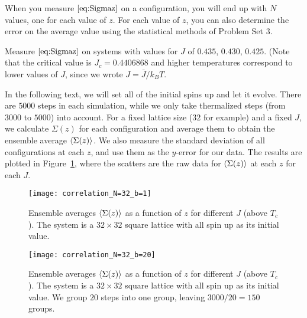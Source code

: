When you measure \(\eqref{eq:Sigmaz}\) on a configuration, you will end up with \(N\)
values, one for each value of \(z\). For each value of \(z\), you can also determine the
error on the average value using the statistical methods of Problem Set 3.

\Question{} Measure \(\eqref{eq:Sigmaz}\) on systems with values for \(J\) of \(0.435\),
\(0.430\), \(0.425\). (Note that the critical value is \(J_c = 0.4406868\) and higher
temperatures correspond to lower values of \(J\), since we wrote \(J = \bar{J} / k_B T\).

\Answer{}
In the following text, we will set all of the initial spins up and let it evolve.
There are \(5000\) steps in each simulation, while we only take thermalized steps
(from \(3000\) to \(5000\)) into account.
For a fixed lattice size (\(32\) for example) and a fixed \(J\),
we calculate \(\Sigma(z)\) for each configuration and average them to obtain the
ensemble average \(\expval{\Sigma(z)}\).
We also measure the standard deviation of all configurations at each \(z\),
and use them as the \(y\)-error for our data.
The results are plotted in Figure~\ref{fig:cor_N=32_bin=1},
where the scatters are the raw data for \(\expval{\Sigma(z)}\) at each \(z\)
for each \(J\).

\begin{figure}
    \centering
    \texttt{[image: correlation\_N=32\_b=1]}
    \caption{Ensemble averages \(\expval{\Sigma(z)}\) as a function of \(z\) for different
        \(J\) (above \(T_c\)). The system is a \(32 \times 32\) square lattice
        with all spin up as its initial value.}
    \label{fig:cor_N=32_bin=1}
\end{figure}

\begin{figure}[H]
    \centering
    \texttt{[image: correlation\_N=32\_b=20]}
    \caption{Ensemble averages \(\expval{\Sigma(z)}\) as a function of \(z\) for different
        \(J\) (above \(T_c\)). The system is a \(32 \times 32\) square lattice
        with all spin up as its initial value.
        We group \(20\) steps into one group, leaving \(3000 / 20 = 150\) groups.}
    \label{fig:cor_N=32_bin=20}
\end{figure}

